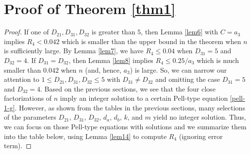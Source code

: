 \documentclass[12pt]{article}
\begin{document}

\section{Proof of Theorem \ref{thm1}}

\begin{proof}
If one of $D_{21}, D_{31}, D_{32}$ is greater than $5$, then Lemma \ref{lem6} with $C = a_3$ implies $R_4 < 0.042$ which is smaller than the upper bound in the theorem when $n$ is sufficiently large. By Lemma \ref{lem7}, we have $R_4 \le 0.04$ when $D_{31} = 5$ and $D_{32} = 4$. If $D_{31} = D_{32}$, then Lemma \ref{lem8} implies $R_4 \le 0.25 / a_3$ which is much smaller than $0.042$ when $n$ (and, hence, $a_3$) is large. So, we can narrow our attention to $1 \le D_{21}, D_{31}, D_{32} \le 5$ with $D_{31} \neq D_{32}$ and omitting the case $D_{31} = 5$ and $D_{32} = 4$. Based on the previous sections, we see that the four close factorizations of $n$ imply an integer solution to a certain Pell-type equation \eqref{pell-1-g}. However, as shown from the tables in the previous sections, many selections of the parameters $D_{21}$, $D_{31}$, $D_{32}$, $d_a$, $d_b$, $k$, and $m$ yield no integer solution. Thus, we can focus on those Pell-type equations with solutions and we summarize them into the table below, using Lemma \ref{lem14} to compute $R_4$ (ignoring error term). 

\bigskip


\end{proof}
\end{document}
